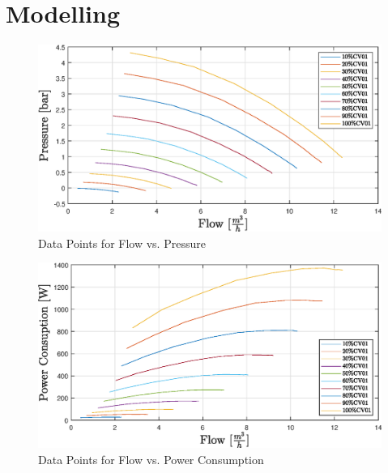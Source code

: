 \chapter{Modelling}
\label{app:modelling}
\newpage
\begin{figure}[H]
	\centering
	\includegraphics[width=1\textheight, height = 1\textwidth, keepaspectratio, angle = 270]{figures/05mathematicalModelling/flowVsPressureRun34.eps}
	\caption{Data Points for Flow vs. Pressure}
\end{figure}

\begin{figure}[H]
	\centering
	\includegraphics[width=1\textheight, height = 1\textwidth, keepaspectratio,  angle = 270]{figures/05mathematicalModelling/flowVsPowerRun34.eps}
	\caption{Data Points for Flow vs. Power Consumption}
\end{figure}

